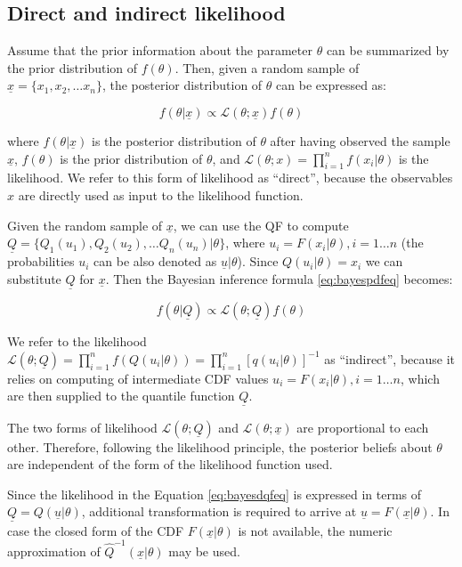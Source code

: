 \documentclass[
  12pt,
]{article}
\begin{document}
\hypertarget{direct-and-indirect-likelihood}{%
\subsection{Direct and indirect likelihood}\label{direct-and-indirect-likelihood}}

Assume that the prior information about the parameter \(\theta\) can be summarized by the prior distribution of \(f(\theta)\). Then, given a random sample of \(\underline x=\{x_1, x_2, \dots x_n\}\), the posterior distribution of \(\theta\) can be expressed as:

\[
f(\theta|\underline{x}) \propto \mathcal{L}(\theta;\underline{x})f(\theta)
\label{eq:bayespdfeq}
\]

where \(f(\theta|\underline{x})\) is the posterior distribution of \(\theta\) after having observed the sample \(\underline{x}\), \(f(\theta)\) is the prior distribution of \(\theta\), and \(\mathcal{L}(\theta;x)=\prod_{i=1}^{n}f(x_i|\theta)\) is the likelihood. We refer to this form of likelihood as ``direct'', because the observables \(x\) are directly used as input to the likelihood function.

Given the random sample of \(\underline x\), we can use the QF to compute \(\underline{Q}=\{Q_1(u_1), Q_2(u_2), \dots Q_n(u_n)|\theta\}\), where \(u_i=F(x_i|\theta), i=1\dots n\) (the probabilities \(u_i\) can be also denoted as \(\underline u|\theta\)). Since \(Q(u_i|\theta)=x_i\) we can substitute \(\underline Q\) for \(\underline x\). Then the Bayesian inference formula \eqref{eq:bayespdfeq} becomes:

\[
f(\theta|\underline{Q}) \propto \mathcal{L}(\theta;\underline{Q})f(\theta)
\label{eq:bayesdqfeq}
\]

We refer to the likelihood \(\mathcal{L}(\theta;\underline{Q})=\prod_{i=1}^{n} f(Q(u_i|\theta))=\prod_{i=1}^n[q(u_i|\theta)]^{-1}\) as ``indirect'', because it relies on computing of intermediate CDF values \(u_i=F(x_i|\theta), i=1\dots n\), which are then supplied to the quantile function \(\underline{Q}\).

The two forms of likelihood \(\mathcal{L}(\theta;\underline{Q})\) and \(\mathcal{L}(\theta;\underline{x})\) are proportional to each other. Therefore, following the likelihood principle, the posterior beliefs about \(\theta\) are independent of the form of the likelihood function used.

Since the likelihood in the Equation \eqref{eq:bayesdqfeq} is expressed in terms of \(\underline {Q}=Q(\underline{u}|\theta)\), additional transformation is required to arrive at \(\underline{u}=F(\underline{x}|\theta)\). In case the closed form of the CDF \(F(\underline x|\theta)\) is not available, the numeric approximation of \(\widehat{Q}^{-1}(\underline{x}|\theta)\) may be used.
\end{document}
